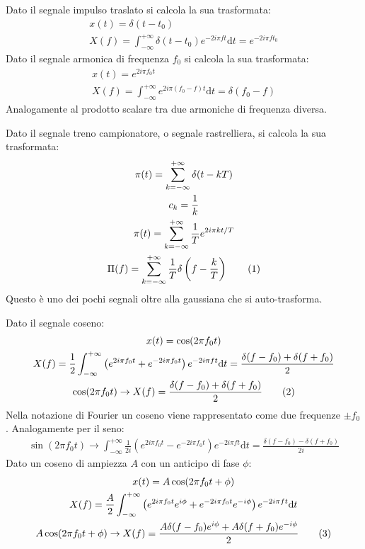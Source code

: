 \documentclass{article}
\newcommand{\df}{\mathrm{d}}
\newcommand{\tageq}{\tag{\stepcounter{equation}\theequation}}
\numberwithin{equation}{subsection}
\begin{document}
Dato il segnale impulso traslato si calcola la sua trasformata:
\begin{gather*}
    x(t)=\delta (t-t_0)\\
    X(f)=\displaystyle\int_{-\infty}^{+\infty}\delta(t-t_0)e^{-2i\pi ft}\df t=e^{-2i\pi ft_0}
\end{gather*}
Dato il segnale armonica di frequenza $f_0$ si calcola la sua trasformata:
\begin{gather*}
    x(t)=e^{2i\pi f_0t}\\
    X(f)=\displaystyle\int_{-\infty}^{+\infty}e^{2i\pi(f_0-f)t}\df t=\delta(f_0-f)
\end{gather*}
Analogamente al prodotto scalare tra due armoniche di frequenza diversa. 


Dato il segnale treno campionatore, o segnale rastrelliera, si calcola la sua trasformata:
\begin{gather*}
    \pi(t)=\displaystyle\sum_{k=-\infty}^{+\infty}\delta(t-kT)\\
    c_k=\displaystyle\frac{1}{k}\\
    \pi(t)=\displaystyle\sum_{k=-\infty}^{+\infty}\frac{1}{T}e^{2i\pi kt/T}\\
    \Pi(f)=\displaystyle\sum_{k=-\infty}^{+\infty}\frac{1}{T}\delta\left(f-\frac{k}{T}\right)\tageq
\end{gather*}
Questo è uno dei pochi segnali oltre alla gaussiana che si auto-trasforma. 


Dato il segnale coseno:
\begin{gather*}
    x(t)=\cos(2\pi f_0t)\\
    X(f)=\displaystyle\frac{1}{2}\int_{-\infty}^{+\infty}\left(e^{2i\pi f_0t}+e^{-2i\pi f_0t}\right)e^{-2i\pi ft}\df t=\frac{\delta(f-f_0)+\delta(f+f_0)}{2}\\
    \cos(2\pi f_0t)\rightarrow X(f)=\displaystyle\frac{\delta(f-f_0)+\delta(f+f_0)}{2}\tageq
\end{gather*}
Nella notazione di Fourier un coseno viene rappresentato come due frequenze $\pm f_0$. 
Analogamente per il seno:
\begin{gather}
    \sin(2\pi f_0t)\to\displaystyle\int_{-\infty}^{+\infty}\frac{1}{2i}(e^{2i\pi f_0t}-e^{-2i\pi f_0t})e^{-2i\pi ft}\df t=\frac{\delta (f-f_0)-\delta(f+f_0)}{2i}
\end{gather}
Dato un coseno di ampiezza $A$ con un anticipo di fase $\phi$: 
\begin{gather*}
    x(t)=A\cos(2\pi f_0t+\phi)\\
    X(f)=\displaystyle\frac{A}{2}\int_{-\infty}^{+\infty}\left(e^{2i\pi f_0t}e^{i\phi}+e^{-2i\pi f_0t}e^{-i\phi}\right)e^{-2i\pi ft}\df t\\
    A\cos(2\pi f_0t+\phi)\to X(f)=\frac{A\delta(f-f_0)e^{i\phi}+A\delta(f+f_0)e^{-i\phi}}{2}\tageq
\end{gather*}
\end{document}

